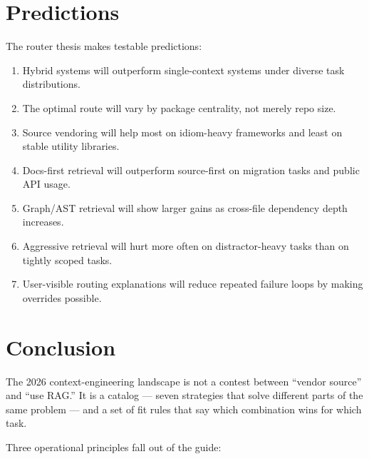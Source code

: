 \documentclass[
  11pt,
  letterpaper,
  numbers=noendperiod,
  parskip=half]{scrartcl}
\providecommand{\tightlist}{%
  \setlength{\itemsep}{0pt}\setlength{\parskip}{0pt}}
\begin{document}
\section{Predictions}\label{sec-predictions}

The router thesis makes testable predictions:

\begin{enumerate}
\def\labelenumi{\arabic{enumi}.}
\tightlist
\item
  Hybrid systems will outperform single-context systems under diverse
  task distributions.
\item
  The optimal route will vary by package centrality, not merely repo
  size.
\item
  Source vendoring will help most on idiom-heavy frameworks and least on
  stable utility libraries.
\item
  Docs-first retrieval will outperform source-first on migration tasks
  and public API usage.
\item
  Graph/AST retrieval will show larger gains as cross-file dependency
  depth increases.
\item
  Aggressive retrieval will hurt more often on distractor-heavy tasks
  than on tightly scoped tasks.
\item
  User-visible routing explanations will reduce repeated failure loops
  by making overrides possible.
\end{enumerate}

\fi

\section{Conclusion}\label{sec-conclusion}

The 2026 context-engineering landscape is not a contest between
``vendor source'' and ``use RAG.'' It is a catalog --- seven strategies
that solve different parts of the same problem --- and a set of fit
rules that say which combination wins for which task.

Three operational principles fall out of the guide:
\end{document}
